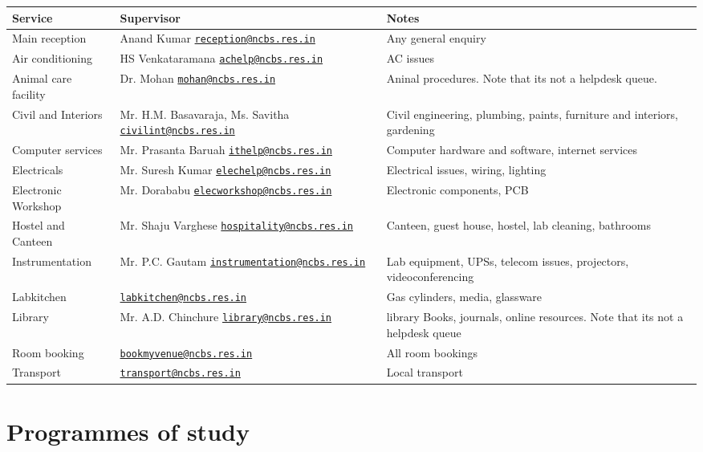 \documentclass[a4paper,10pt]{article}
\newcommand\MAILTOBREAK[2]{#1 \Letter\; \href{mailto:#2}{\nolinkurl{#2}}}
\begin{document}
\begin{tabularx}{\textwidth}{l X X}
    \toprule
    Service & Supervisor & Notes \\
    \midrule
    Main reception & \MAILTOBREAK{Anand Kumar}{reception@ncbs.res.in} & Any general enquiry \\
    Air conditioning & \MAILTOBREAK{HS Venkataramana}{achelp@ncbs.res.in} & AC issues \\
    Animal care facility & \MAILTOBREAK{Dr. Mohan}{mohan@ncbs.res.in} & Aninal
        procedures. Note that its not a helpdesk queue.  \\
    Civil and Interiors & \MAILTOBREAK{Mr. H.M. Basavaraja, Ms.
    Savitha}{civilint@ncbs.res.in} & Civil engineering, plumbing, paints,
        furniture and interiors, gardening \\
    Computer services & \MAILTOBREAK{Mr. Prasanta Baruah}{ithelp@ncbs.res.in} & 
        Computer hardware and software, internet services \\
    Electricals & \MAILTOBREAK{ Mr. Suresh Kumar}{elechelp@ncbs.res.in} & 
            Electrical issues, wiring, lighting \\
    Electronic Workshop & \MAILTOBREAK{Mr.  Dorababu}{elecworkshop@ncbs.res.in} & 
        Electronic components, PCB \\
    Hostel and Canteen & \MAILTOBREAK{Mr. Shaju Varghese}{hospitality@ncbs.res.in} & 
        Canteen, guest house, hostel, lab cleaning, bathrooms \\
    Instrumentation & \MAILTOBREAK{Mr. P.C. Gautam}{instrumentation@ncbs.res.in} &
        Lab equipment, UPSs, telecom issues, projectors, videoconferencing \\
    Labkitchen & \MAILTOBREAK{ }{labkitchen@ncbs.res.in} & Gas cylinders, media, glassware \\
    Library & \MAILTOBREAK{Mr. A.D. Chinchure}{library@ncbs.res.in} &
        library Books, journals, online resources. Note that its not a helpdesk
        queue \\
    Room booking & \MAILTOBREAK{ }{bookmyvenue@ncbs.res.in} & All room bookings \\
    Transport & \MAILTOBREAK{}{transport@ncbs.res.in} & Local transport \\
    \bottomrule
\end{tabularx}


\newpage
\section{Programmes of study}
\end{document}
